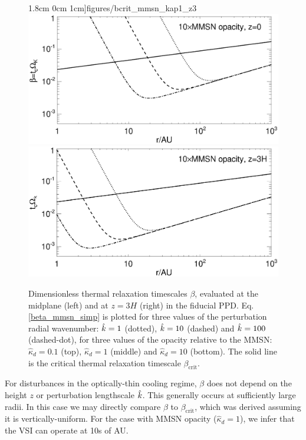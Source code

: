 \begin{figure}
  1.8cm 0cm 1cm]{figures/bcrit_mmsn_kap1_z3}\\
  \includegraphics[scale=.47,clip=true,trim=0cm 0cm 0cm
  1cm]{figures/bcrit_mmsn_kap10_z0}\includegraphics[scale=.47,clip=true,trim=2.5cm 0cm 0cm
  1cm]{figures/bcrit_mmsn_kap10_z3} 
  \caption{Dimensionless thermal relaxation timescales $\beta$,
    evaluated at the midplane (left) and at $z=3H$ (right) in the
    fiducial PPD. Eq. \ref{beta_mmsn_simp} is plotted  
    for three values of the 
    perturbation radial wavenumber: $\hat{k}=1$ (dotted), $\hat{k}=10$
    (dashed) and $\hat{k}=100$ (dashed-dot), for three values of the
    opacity relative to the MMSN: $\hat{\kappa}_d=0.1$ (top),
    $\hat{\kappa}_d=1$ (middle) and $\hat{\kappa}_d=10$ (bottom).  
    The solid line is the 
    critical thermal relaxation timescale $\beta_\mathrm{crit}$.  
    \label{mmsn_bcrit_bcool}}   
\end{figure}  


For disturbances in the optically-thin cooling regime, $\beta$ does
not depend on the height $z$ or perturbation lengthscale $\hat{k}$. This
generally occurs at sufficiently large radii. In this case we may
directly compare $\beta$ to $\beta_\mathrm{crit}$, which was derived
assuming it is vertically-uniform.  For the case with MMSN
opacity ($\hat{\kappa}_d=1$), we  infer that the VSI can operate at
10s of AU.   

